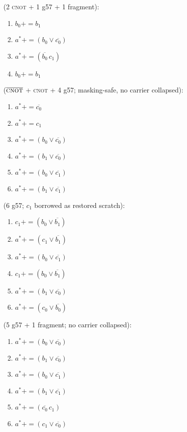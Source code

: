 \documentclass[11pt]{article}
\newcommand{\CNOT}{\textsc{cnot}}
\newcommand{\pe}{\mathrel{{+}{=}}}    %
\newcommand{\at}{a^{\ast}}            %
\begin{document}
 (2 \CNOT{} + 1 g57 + 1 fragment):
\begin{enumerate}\itemsep1pt
\item $b_0 \pe b_1$ 
\item $\at \pe (b_0 \vee \overline{c_0})$ 
\item $\at \pe (\overline{b_0}\, c_1)$ 
\item $b_0 \pe b_1$ 
\end{enumerate}

 ($\overline{\CNOT{}}$ + \CNOT{} + 4 g57; masking-safe, no carrier collapsed):
\begin{enumerate}\itemsep1pt
\item $\at \pe \overline{c_0}$
\item $\at \pe c_1$ 
\item $\at \pe (b_0 \vee \overline{c_0})$
\item $\at \pe (b_1 \vee \overline{c_0})$
\item $\at \pe (b_0 \vee \overline{c_1})$
\item $\at \pe (b_1 \vee \overline{c_1})$ 
\end{enumerate}

 (6 g57; $c_1$ borrowed as restored scratch):
\begin{enumerate}\itemsep1pt
\item $c_1 \pe (b_0 \vee \overline{b_1})$ 
\item $\at \pe (c_1 \vee \overline{b_1})$
\item $\at \pe (b_0 \vee \overline{c_1})$
\item $c_1 \pe (b_0 \vee \overline{b_1})$ 
\item $\at \pe (b_1 \vee \overline{c_0})$
\item $\at \pe (c_0 \vee \overline{b_0})$
\end{enumerate}

 (5 g57 + 1 fragment; no carrier collapsed):
\begin{enumerate}\itemsep1pt
\item $\at \pe (b_0 \vee \overline{c_0})$
\item $\at \pe (b_1 \vee \overline{c_0})$
\item $\at \pe (b_0 \vee \overline{c_1})$
\item $\at \pe (b_1 \vee \overline{c_1})$ 
\item $\at \pe (\overline{c_0}\, c_1)$
\item $\at \pe (c_1 \vee \overline{c_0})$ 
\end{enumerate}
\end{document}
